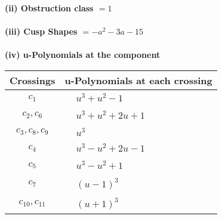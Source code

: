 \documentclass[1p]{elsarticle_modified}
\theoremstyle{definition}
\begin{document}
\flushleft \textbf{(ii) Obstruction class $= 1$}\\~\\
\flushleft \textbf{(iii) Cusp Shapes $= - a^2-3 a-15$}\\~\\
\newpage\renewcommand{\arraystretch}{1}
\flushleft \textbf{(iv) u-Polynomials at the component}\newline \\
\begin{tabular}{m{50pt}|m{274pt}}
Crossings & \hspace{64pt}u-Polynomials at each crossing \\
\hline $$\begin{aligned}c_{1}\end{aligned}$$&$\begin{aligned}
&u^3+u^2-1
\end{aligned}$\\
\hline $$\begin{aligned}c_{2},c_{6}\end{aligned}$$&$\begin{aligned}
&u^3+u^2+2 u+1
\end{aligned}$\\
\hline $$\begin{aligned}c_{3},c_{8},c_{9}\end{aligned}$$&$\begin{aligned}
&u^3
\end{aligned}$\\
\hline $$\begin{aligned}c_{4}\end{aligned}$$&$\begin{aligned}
&u^3- u^2+2 u-1
\end{aligned}$\\
\hline $$\begin{aligned}c_{5}\end{aligned}$$&$\begin{aligned}
&u^3- u^2+1
\end{aligned}$\\
\hline $$\begin{aligned}c_{7}\end{aligned}$$&$\begin{aligned}
&(u-1)^3
\end{aligned}$\\
\hline $$\begin{aligned}c_{10},c_{11}\end{aligned}$$&$\begin{aligned}
&(u+1)^3
\end{aligned}$\\
\hline
\end{tabular}\\~\\
\end{document}
